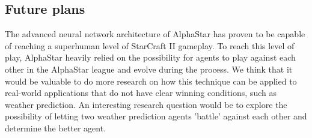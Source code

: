 \subsection{Future plans}

The advanced neural network architecture of AlphaStar has proven to be capable of reaching a superhuman level of StarCraft II gameplay. To reach this level of play, AlphaStar heavily relied on the possibility for agents to play against each other in the AlphaStar league and evolve during the process. We think that it would be valuable to do more research on how this technique can be applied to real-world applications that do not have clear winning conditions, such as weather prediction. An interesting research question would be to explore the possibility of letting two weather prediction agents 'battle' against each other and determine the better agent. 